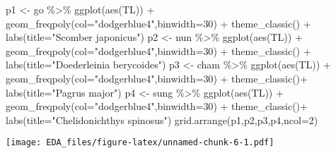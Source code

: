 \documentclass[
]{article}
\newenvironment{Shaded}{\begin{snugshade}}{\end{snugshade}}
\newcommand{\AttributeTok}[1]{\textcolor[rgb]{0.77,0.63,0.00}{#1}}
\newcommand{\DecValTok}[1]{\textcolor[rgb]{0.00,0.00,0.81}{#1}}
\newcommand{\FunctionTok}[1]{\textcolor[rgb]{0.00,0.00,0.00}{#1}}
\newcommand{\NormalTok}[1]{#1}
\newcommand{\OtherTok}[1]{\textcolor[rgb]{0.56,0.35,0.01}{#1}}
\newcommand{\SpecialCharTok}[1]{\textcolor[rgb]{0.00,0.00,0.00}{#1}}
\newcommand{\StringTok}[1]{\textcolor[rgb]{0.31,0.60,0.02}{#1}}
\begin{document}
\begin{Shaded}
\begin{Highlighting}[]
\NormalTok{p1 }\OtherTok{\textless{}{-}}\NormalTok{ go }\SpecialCharTok{\%\textgreater{}\%} \FunctionTok{ggplot}\NormalTok{(}\FunctionTok{aes}\NormalTok{(TL)) }\SpecialCharTok{+} \FunctionTok{geom\_freqpoly}\NormalTok{(}\AttributeTok{col=}\StringTok{"dodgerblue4"}\NormalTok{,}\AttributeTok{binwidth=}\DecValTok{30}\NormalTok{) }\SpecialCharTok{+} \FunctionTok{theme\_classic}\NormalTok{() }\SpecialCharTok{+} \FunctionTok{labs}\NormalTok{(}\AttributeTok{title=}\StringTok{"Scomber japonicus"}\NormalTok{)}
\NormalTok{p2 }\OtherTok{\textless{}{-}}\NormalTok{ nun }\SpecialCharTok{\%\textgreater{}\%} \FunctionTok{ggplot}\NormalTok{(}\FunctionTok{aes}\NormalTok{(TL)) }\SpecialCharTok{+} \FunctionTok{geom\_freqpoly}\NormalTok{(}\AttributeTok{col=}\StringTok{"dodgerblue4"}\NormalTok{,}\AttributeTok{binwidth=}\DecValTok{30}\NormalTok{) }\SpecialCharTok{+} \FunctionTok{theme\_classic}\NormalTok{() }\SpecialCharTok{+} \FunctionTok{labs}\NormalTok{(}\AttributeTok{title=}\StringTok{"Doederleinia berycoides"}\NormalTok{)}
\NormalTok{p3 }\OtherTok{\textless{}{-}}\NormalTok{ cham }\SpecialCharTok{\%\textgreater{}\%} \FunctionTok{ggplot}\NormalTok{(}\FunctionTok{aes}\NormalTok{(TL)) }\SpecialCharTok{+} \FunctionTok{geom\_freqpoly}\NormalTok{(}\AttributeTok{col=}\StringTok{"dodgerblue4"}\NormalTok{,}\AttributeTok{binwidth=}\DecValTok{30}\NormalTok{) }\SpecialCharTok{+} \FunctionTok{theme\_classic}\NormalTok{()}\SpecialCharTok{+} \FunctionTok{labs}\NormalTok{(}\AttributeTok{title=}\StringTok{"Pagrus major"}\NormalTok{)}
\NormalTok{p4 }\OtherTok{\textless{}{-}}\NormalTok{ sung }\SpecialCharTok{\%\textgreater{}\%} \FunctionTok{ggplot}\NormalTok{(}\FunctionTok{aes}\NormalTok{(TL)) }\SpecialCharTok{+} \FunctionTok{geom\_freqpoly}\NormalTok{(}\AttributeTok{col=}\StringTok{"dodgerblue4"}\NormalTok{,}\AttributeTok{binwidth=}\DecValTok{30}\NormalTok{) }\SpecialCharTok{+} \FunctionTok{theme\_classic}\NormalTok{()}\SpecialCharTok{+} \FunctionTok{labs}\NormalTok{(}\AttributeTok{title=}\StringTok{"Chelidonichthys spinosus"}\NormalTok{)}
\FunctionTok{grid.arrange}\NormalTok{(p1,p2,p3,p4,}\AttributeTok{ncol=}\DecValTok{2}\NormalTok{)}
\end{Highlighting}
\end{Shaded}

\texttt{[image: EDA\_files/figure-latex/unnamed-chunk-6-1.pdf]}
\end{document}

